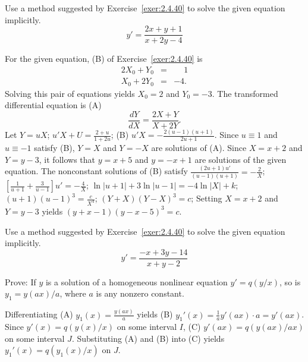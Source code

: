 \documentclass{ximera}
\begin{document}
\begin{problem}\label{exer:2.4.42} Use a method suggested by Exercise~\ref{exer:2.4.40} to solve the
given equation implicitly.
$$y'=\frac{2x+y+1}{x+2y-4}$$



\begin{solution}
    For the given equation, (B)
of Exercise~\ref{exer:2.4.40} is
\begin{eqnarray*}
2X_0+Y_0&=&\phantom{-}1\\
X_0+2Y_0&=&-4.
\end{eqnarray*}
Solving this pair of equations yields   $X_0=2$ and $Y_0=-3$.
The transformed differential equation is (A)
$$
\frac{dY}{ dX}=\frac{2X+Y}{ X+2Y}.
$$
Let $Y=uX$;\;
$u'X+U=\frac{2+u}{1+2u}$;\;
(B) $u'X=-\frac{2(u-1)(u+1)}{ 2u+1}$. Since $u\equiv1$ and
$u\equiv-1$
satisfy (B), $Y=X$ and $Y=-X$ are solutions of (A).
 Since $X=x+2$ and $Y=y-3$, it follows that $y=x+5$
and $y=-x+1$ are solutions of the given equation. The nonconstant
solutions of (B) satisfy
$\frac{(2u+1)u'}{(u-1)(u+1)}=-\frac{2}{ X}$;\;
$\left[\frac{1}{ u+1}+\frac{3}{ u-1}\right]u'=-\frac{4}{
X}$;\;
$\ln|u+1|+3\ln|u-1|=-4\ln|X|+k$;\;
$(u+1)(u-1)^3=\frac{c}{ X^4}$;\;
$(Y+X)(Y-X)^3=c$;\;
Setting $X=x+2$ and $Y=y-3$ yields
$(y+x-1)(y-x-5)^3=c$.

\end{solution}
\end{problem}

\begin{problem}\label{exer:2.4.43} Use a method suggested by Exercise~\ref{exer:2.4.40} to solve the
given equation implicitly.
$$y'=\frac{-x+3y-14}{x+y-2}$$
\end{problem}

\begin{problem}\label{exer:2.4.54}
 Prove:  If $y$ is a solution of a homogeneous nonlinear equation
$y'=q(y/x)$,  so is $y_1=y(ax)/a$, where $a$ is any nonzero
constant.



\begin{solution}
    Differentiating  (A) $y_1(x)=\frac{y(ax)}{a}$   yields
(B) $y_1'(x)=\frac{1}{a}y'(ax)\cdot a=y'(ax)$. Since
$y'(x)=q(y(x)/x)$ on some interval $I$, (C) $y'(ax)=q(y(ax)/ax)$
on some interval $J$. Substituting (A) and (B) into (C)
yields $y_1'(x)=q(y_1(x)/x)$ on $J$.
\end{solution}
\end{problem}
\end{document}
